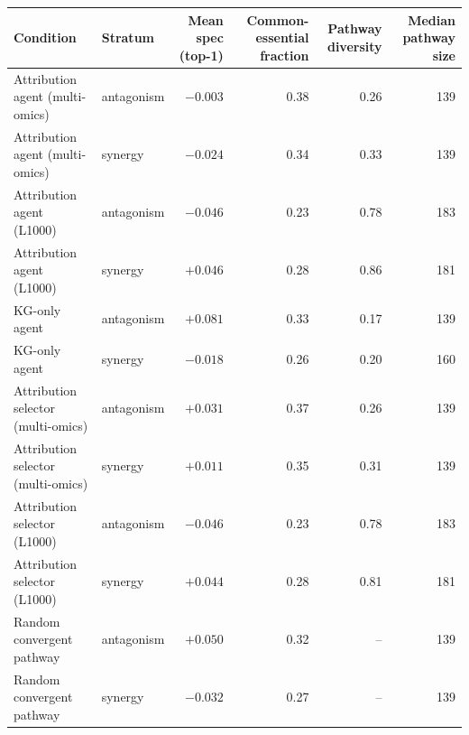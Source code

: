 \begin{tabular}{@{}llrrrr@{}}
\toprule
Condition & Stratum & Mean spec (top-1) & Common-essential fraction & Pathway diversity & Median pathway size \\
\midrule
Attribution agent (multi-omics) & antagonism & $-0.003$ & 0.38 & 0.26 & 139 \\
Attribution agent (multi-omics) & synergy & $-0.024$ & 0.34 & 0.33 & 139 \\
\addlinespace
Attribution agent (L1000) & antagonism & $-0.046$ & 0.23 & 0.78 & 183 \\
Attribution agent (L1000) & synergy & $+0.046$ & 0.28 & 0.86 & 181 \\
\addlinespace
KG-only agent & antagonism & $+0.081$ & 0.33 & 0.17 & 139 \\
KG-only agent & synergy & $-0.018$ & 0.26 & 0.20 & 160 \\
\addlinespace
Attribution selector (multi-omics) & antagonism & $+0.031$ & 0.37 & 0.26 & 139 \\
Attribution selector (multi-omics) & synergy & $+0.011$ & 0.35 & 0.31 & 139 \\
\addlinespace
Attribution selector (L1000) & antagonism & $-0.046$ & 0.23 & 0.78 & 183 \\
Attribution selector (L1000) & synergy & $+0.044$ & 0.28 & 0.81 & 181 \\
\addlinespace
Random convergent pathway & antagonism & $+0.050$ & 0.32 & -- & 139 \\
Random convergent pathway & synergy & $-0.032$ & 0.27 & -- & 139 \\
\bottomrule
\end{tabular}
